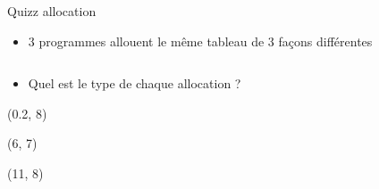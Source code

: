 \documentclass[11pt,mathserif]{beamer}
\newcommand{\scout}{\faAngellist}
\newcommand{\galde}{\faQuestion}
\newif\ifC
\newcommand{\mylang}{c}
\newcommand{\extlang}{c}
\newcommand{\mylang}{fortran}
\newcommand{\extlang}{f90}
\newcommand{\includeSrc}[1]{}
\begin{document}
\begin{frame}{Quizz allocation}
  \lstset{numbers=none}
  \begin{itemize}
    \pause
    \item[\scout] 3 programmes allouent le même tableau de 3 façons différentes
\begin{columns}[T]
\pause
  \begin{column}{4cm}
  \includeSrc{code/mem1}
    
\end{column}
\pause
  \vrule{}
  \begin{column}{4cm}
  \includeSrc{code/mem2}
  
  \end{column}
\pause
  \vrule{}
  \begin{column}{4cm}
  \includeSrc{code/mem3}
  
  \end{column}
\end{columns}
    \pause
    \item[\galde] Quel est le type de chaque allocation ?
  \end{itemize}
\begin{textblock}{12}(0.2, 8)
\end{textblock}

\begin{textblock}{12}(6, 7)
\end{textblock}

\begin{textblock}{12}(11, 8)
\end{textblock}

\end{frame}
  \lstset{numbers=left}
\ifC
\end{document}
